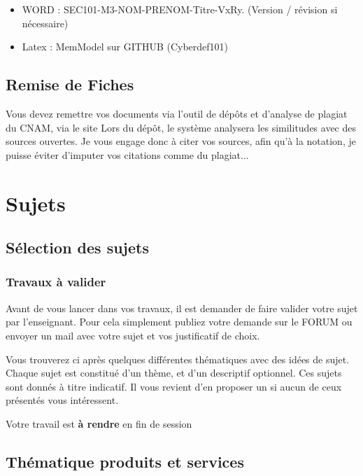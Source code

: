 \begin{itemize}
  \item WORD : SEC101-M3-NOM-PRENOM-Titre-VxRy. (Version / révision si nécessaire)
  \item Latex :  MemModel sur GITHUB (Cyberdef101)
\end{itemize}

\subsection{Remise de Fiches}

Vous devez remettre vos documents via l'outil de dépôts et d'analyse de plagiat du CNAM, via le site 
Lors du dépôt, le système analysera les similitudes avec des sources ouvertes. Je vous engage donc à citer vos sources, afin qu'à la notation, je puisse éviter d'imputer vos citations comme du plagiat...

\section{Sujets}


\subsection{Sélection des sujets}

\begin{frame}
\frametitle<presentation>{Travaux à valider}
Avant de vous lancer dans vos travaux, il est demander de faire valider votre sujet par l'enseignant. Pour cela simplement publiez votre demande sur le FORUM ou  envoyer un mail avec votre sujet et vos justificatif de choix.

Vous trouverez ci après quelques différentes thématiques avec des idées de sujet. Chaque sujet est constitué d'un thème, et d'un descriptif optionnel.
Ces sujets sont donnés à titre indicatif. Il vous revient d'en proposer un si aucun de ceux présentés vous intéressent.

Votre travail est \textbf{à rendre} en fin de session

\end{frame}


\subsection{Thématique produits et services}

